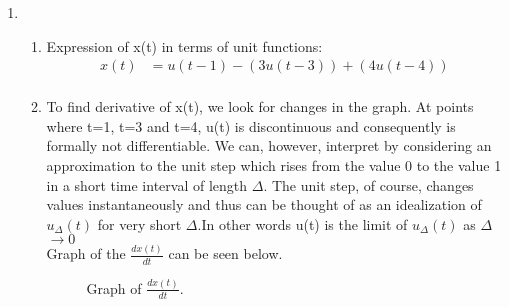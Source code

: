 \documentclass[10pt,a4paper, margin=1in]{article}
\begin{document}
\begin{enumerate}
\item 
    \begin{enumerate}
    \item %
    Expression of x(t) in terms of unit functions:
        \begin{equation}
	\begin{split}
		x(t) &= u(t-1)-(3u(t-3)) +(4u(t-4)) \\
		\end{split}
	\end{equation}
    \item %
    To find derivative of x(t), we look for changes in the graph.
    At points where t=1, t=3 and t=4, u(t) is  discontinuous and consequently is formally not differentiable. We can, however, interpret  by considering an approximation to the unit step which rises from the value 0 to the value 1 in a  short time interval of length $\Delta$. The unit step, of course, changes values instantaneously and thus can be thought of as an idealization of $u_{\Delta}(t)$ for very short $\Delta$.In other words u(t) is the limit of $u_{\Delta}(t)$ as $\Delta$ $\rightarrow 0$ \\
    
    Graph of the $\frac{dx(t)}{dt}$ can be seen below. \\
\begin{figure}[H]
        \centering
        \caption{Graph of $\frac{dx(t)}{dt}$.}
        \label{fig:q6}
    \end{figure}
    \end{enumerate}

\end{enumerate}
\end{document}
